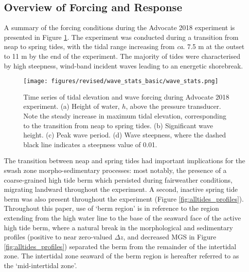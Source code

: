 \documentclass[jmse,article,submit,pdftex,moreauthors]{Definitions/mdpi}
\begin{document}
\subsection{Overview of Forcing and Response}\label{Results:Forcing}

A summary of the forcing conditions during the Advocate 2018 experiment is presented in Figure \ref{fig:wavestats}. The experiment was conducted during a transition from neap to spring tides, with the tidal range increasing from \textit{ca}. 7.5 m at the outset to 11 m by the end of the experiment. The majority of tides were characterised by high steepness, wind-band incident waves leading to an energetic shorebreak. 


\begin{figure}[tbp] %
	\texttt{[image: figures/revised/wave\_stats\_basic/wave\_stats.png]}
	\caption[Wave data: Advocate 2018 experiment]{Time series of tidal elevation and wave forcing during Advocate 2018 experiment. (a) Height of water, $h$, above the pressure transducer. Note the steady increase in maximum tidal elevation, corresponding to the transition from neap to spring tides. (b) Significant wave height. (c) Peak wave period. (d) Wave steepness, where the dashed black line indicates a steepness value of 0.01.} %
	\label{fig:wavestats}
\end{figure}


The transition between neap and spring tides had important implications for the swash zone morpho-sedimentary processes: most notably, the presence of a coarse-grained high tide berm which persisted during fairweather conditions, migrating landward throughout the experiment. A second, inactive spring tide berm was also present throughout the experiment (Figure \ref{fig:alltides_profiles}). Throughout this paper, use of `berm region' is in reference to the region extending from the high water line to the base of the seaward face of the active high tide berm, where a natural break in the morphological and sedimentary profiles (positive to near zero-valued $\Delta z$, and decreased MGS in Figure \ref{fig:alltides_profiles}) separated the berm from the remainder of the intertidal zone. The intertidal zone seaward of the berm region is hereafter referred to as the `mid-intertidal zone'.
\end{document}
